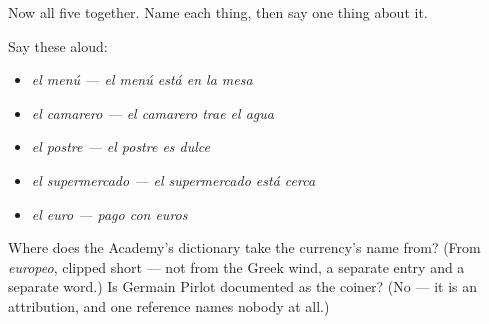 Now all five together. Name each thing, then say one thing about it.

Say these aloud:

\begin{itemize}
\raggedright
  \item \emph{el menú — el menú está en la mesa}
  \item \emph{el camarero — el camarero trae el agua}
  \item \emph{el postre — el postre es dulce}
  \item \emph{el supermercado — el supermercado está cerca}
  \item \emph{el euro — pago con euros}
\end{itemize}

\begin{tcolorbox}[breakable,colback=teal!4,colframe=teal!35!black,title={Before you move on}]
Where does the Academy's dictionary take the currency's name from? (From \emph{europeo}, clipped short — not from the Greek wind, a separate entry and a separate word.) Is Germain Pirlot documented as the coiner? (No — it is an attribution, and one reference names nobody at all.)
\end{tcolorbox}
